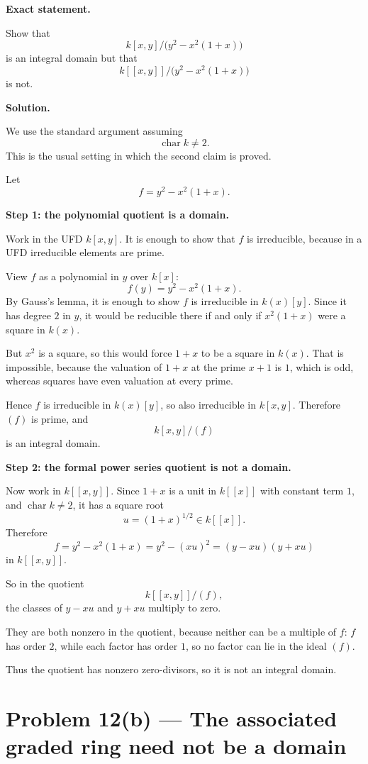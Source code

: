 \documentclass[12pt,a4paper]{article}
\theoremstyle{plain}
\theoremstyle{definition}      %
\begin{document}
	\textbf{Exact statement.}
	
	Show that
	\[
	k[x,y]/\bigl(y^2-x^2(1+x)\bigr)
	\]
	is an integral domain but that
	\[
	k[[x,y]]/\bigl(y^2-x^2(1+x)\bigr)
	\]
	is not.
	
	\bigskip
	\textbf{Solution.}
	
	We use the standard argument assuming
	\[
	\operatorname{char}k\neq 2.
	\]
	This is the usual setting in which the second claim is proved.
	
	Let
	\[
	f=y^2-x^2(1+x).
	\]
	
	\medskip
	\textbf{Step 1: the polynomial quotient is a domain.}
	
	Work in the UFD \(k[x,y]\). It is enough to show that \(f\) is irreducible, because in a UFD irreducible elements are prime.
	
	View \(f\) as a polynomial in \(y\) over \(k[x]\):
	\[
	f(y)=y^2-x^2(1+x).
	\]
	By Gauss's lemma, it is enough to show \(f\) is irreducible in \(k(x)[y]\). Since it has degree \(2\) in \(y\), it would be reducible there if and only if \(x^2(1+x)\) were a square in \(k(x)\).
	
	But \(x^2\) is a square, so this would force \(1+x\) to be a square in \(k(x)\). That is impossible, because the valuation of \(1+x\) at the prime \(x+1\) is \(1\), which is odd, whereas squares have even valuation at every prime.
	
	Hence \(f\) is irreducible in \(k(x)[y]\), so also irreducible in \(k[x,y]\). Therefore \((f)\) is prime, and
	\[
	k[x,y]/(f)
	\]
	is an integral domain.
	
	\medskip
	\textbf{Step 2: the formal power series quotient is not a domain.}
	
	Now work in \(k[[x,y]]\). Since \(1+x\) is a unit in \(k[[x]]\) with constant term \(1\), and \(\operatorname{char}k\neq 2\), it has a square root
	\[
	u=(1+x)^{1/2}\in k[[x]].
	\]
	Therefore
	\[
	f=y^2-x^2(1+x)
	=y^2-(xu)^2
	=(y-xu)(y+xu)
	\]
	in \(k[[x,y]]\).
	
	So in the quotient
	\[
	k[[x,y]]/(f),
	\]
	the classes of \(y-xu\) and \(y+xu\) multiply to zero.
	
	They are both nonzero in the quotient, because neither can be a multiple of \(f\): \(f\) has order \(2\), while each factor has order \(1\), so no factor can lie in the ideal \((f)\).
	
	Thus the quotient has nonzero zero-divisors, so it is not an integral domain.
	
	
	
	\section*{Problem 12(b) --- The associated graded ring need not be a domain}
	
\end{document}
